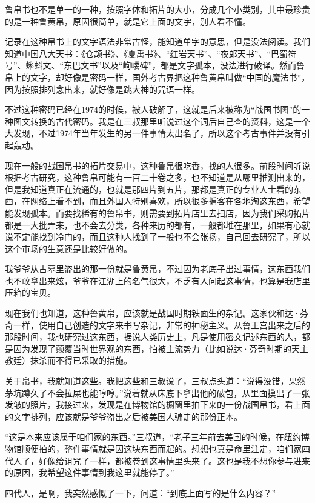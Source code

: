 鲁帛书也不是单一的一种，按照字体和拓片的大小，分成几个小类别，其中最珍贵的是一种鲁黄帛，原因很简单，就是它上面的文字，别人看不懂。

记录在这种帛书上的文字语法非常古怪，能知道单字的意思，但是没法阅读。我们知道中国八大天书：《仓颉书》、《夏禹书》、“红岩天书”、“夜郎天书”、“巴蜀符号”、蝌蚪文、“东巴文书”以及“峋嵝碑”，都是文字孤本，没法进行破译。然而鲁帛上的文字，却好像是密码一样，国外考古界把这种鲁黄帛叫做“中国的魔法书”，因为按照排列念出来，就好像是跳大神的咒语一样。

不过这种密码已经在1974的时候，被人破解了，这就是后来被称为“战国书图”的一种图文转换的古代密码。我是在三叔那里听说过这个词后自己查的资料，这是一个大发现，不过1974年当年发生的另一件事情太出名了，所以这个考古事件并没有引起轰动。

现在一般的战国帛书的拓片交易中，这种鲁帛很吃香，找的人很多。前段时间听说根据考古研究，这种鲁帛可能有一百二十卷之多，也不知道是从哪里推测出来的，但是我知道真正在流通的，也就是那四片到五片，那都是真正的专业人士看的东西，在网络上看不到，而且外国人特别喜欢，所以很多掮客在各地淘这东西，希望能发现孤本。而要找稀有的鲁帛书，则需要到拓片店里去扫店，因为我们采购拓片都是一大批弄来，也不会去分类，各种来历的都有，一般都堆在那里，如果有心就说不定能找到冷门的，而且这种人找到了一般也不会张扬，自己回去研究了，所以这个市场的生意还是比较好做的。

我爷爷从古墓里盗出的那一份就是鲁黄帛，不过因为老底子出过事情，这东西我们也不敢拿出来炫，爷爷在江湖上的名气很大，不乏有人问起这事情，也算是我店里压箱的宝贝。

现在我们也知道，这种鲁黄帛，应该就是战国时期铁面生的杂记。这家伙和达·芬奇一样，使用自己创造的文字来书写杂记，非常的神秘主义。从鲁王宫出来之后的那段时间，我也研究过这东西，据说人类历史上，凡是使用密文记述东西的人，都是因为发现了颠覆当时世界观的东西，怕被主流势力（比如说达·芬奇时期的天主教廷）抹杀而不得已采取的措施。

关于帛书，我就知道这些。我把这些和三叔说了，三叔点头道：“说得没错，果然茅坑蹲久了不会拉屎也能哼哼。”说着就从床底下拿出他的破包，从里面摸出了一张发皱的照片，我接过来，发现是在博物馆的橱窗里拍下来的一份战国帛书，看上面的文字排列，应该就是爷爷盗出之后被美国人骗走的那份正本。

“这是本来应该属于咱们家的东西。”三叔道，“老子三年前去美国的时候，在纽约博物馆顺便拍的，整件事情就是因这块东西而起的。想想也真是命里注定，咱们家四代人了，好像给诅咒了一样，都被卷到这事情里头来了。这也是我不想你参与进来的原因，我希望这件事情到我这里就能停了。”

四代人，是啊，我突然感慨了一下，问道：“到底上面写的是什么内容？”

